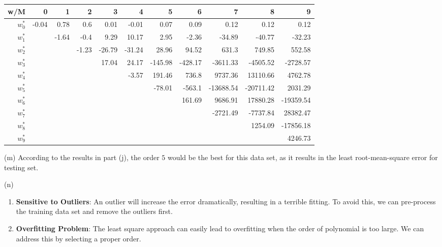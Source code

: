 \begin{solution}
    \begin{tabular}{r|rrrrrrrrrr}
        w/M     & 0     & 1     & 2     & 3      & 4      & 5       & 6       & 7         & 8         & 9         \\
        \hline
        $w^*_0$ & -0.04 & 0.78  & 0.6   & 0.01   & -0.01  & 0.07    & 0.09    & 0.12      & 0.12      & 0.12      \\
        $w^*_1$ &       & -1.64 & -0.4  & 9.29   & 10.17  & 2.95    & -2.36   & -34.89    & -40.77    & -32.23    \\
        $w^*_2$ &       &       & -1.23 & -26.79 & -31.24 & 28.96   & 94.52   & 631.3     & 749.85    & 552.58    \\
        $w^*_3$ &       &       &       & 17.04  & 24.17  & -145.98 & -428.17 & -3611.33  & -4505.52  & -2728.57  \\
        $w^*_4$ &       &       &       &        & -3.57  & 191.46  & 736.8   & 9737.36   & 13110.66  & 4762.78   \\
        $w^*_5$ &       &       &       &        &        & -78.01  & -563.1  & -13688.54 & -20711.42 & 2031.29   \\
        $w^*_6$ &       &       &       &        &        &         & 161.69  & 9686.91   & 17880.28  & -19359.54 \\
        $w^*_7$ &       &       &       &        &        &         &         & -2721.49  & -7737.84  & 28382.47  \\
        $w^*_8$ &       &       &       &        &        &         &         &           & 1254.09   & -17856.18 \\
        $w^*_9$ &       &       &       &        &        &         &         &           &           & 4246.73
    \end{tabular}

    (m) According to the results in part (j), the order $5$ would be the best for this data set, as it results in the least root-mean-square error for testing set.

    (n)
    \begin{enumerate}
        \item {
            \textbf{Sensitive to Outliers}: An outlier will increase the error dramatically, resulting in a terrible fitting. To avoid this, we can pre-process the training data set and remove the outliers first.
        }
        \item {
            \textbf{Overfitting Problem}: The least square approach can easily lead to overfitting when the order of polynomial is too large. We can address this by selecting a proper order.
        }
    \end{enumerate}

\end{solution}